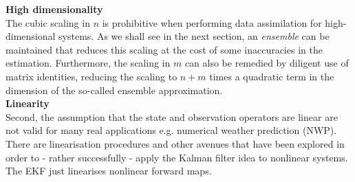 \textbf{High dimensionality}\\
The cubic scaling in $n$ is prohibitive when performing data assimilation for high-dimensional
systems. As we shall see in the next section, an \emph{ensemble} can be maintained that reduces
this scaling at the cost of some inaccuracies in the estimation. Furthermore, the scaling in $m$ can
also be remedied by diligent use of matrix identities, reducing the scaling to $n + m$ times a
quadratic term in the dimension of the so-called ensemble approximation.\\

\textbf{Linearity}\\
Second, the assumption that the state and observation operators are linear are not valid for
many real applications e.g. numerical weather prediction (NWP). There are linearisation procedures
and other avenues that have been explored in order to - rather successfully - apply the Kalman
filter idea to nonlinear systems.\\

The EKF just linearises nonlinear forward maps.

